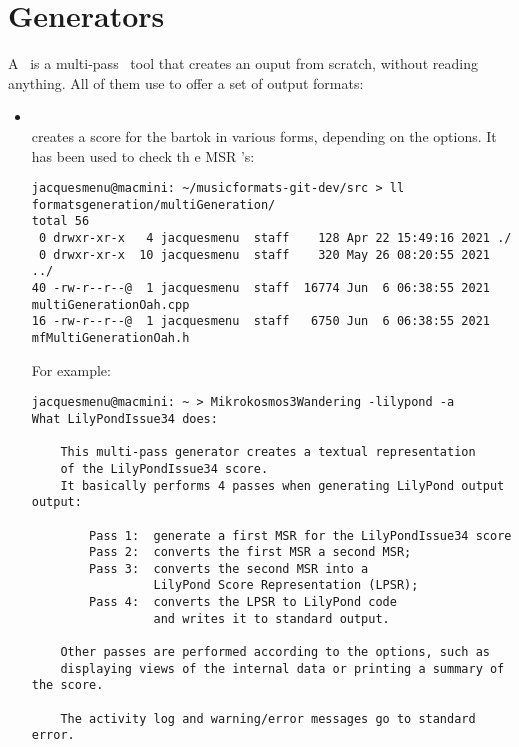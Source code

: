 \section{Generators}

A \generator\ is a multi-pass \CLI\ tool that creates an ouput from scratch, without reading anything. All of them use  to offer a set of output formats:
\begin{itemize}
\item {}\\
			creates a score for the bartok in various forms, depending on the options. It has been used to check th e MSR \API's:

\begin{lstlisting}[language=Terminal]
jacquesmenu@macmini: ~/musicformats-git-dev/src > ll formatsgeneration/multiGeneration/
total 56
 0 drwxr-xr-x   4 jacquesmenu  staff    128 Apr 22 15:49:16 2021 ./
 0 drwxr-xr-x  10 jacquesmenu  staff    320 May 26 08:20:55 2021 ../
40 -rw-r--r--@  1 jacquesmenu  staff  16774 Jun  6 06:38:55 2021 multiGenerationOah.cpp
16 -rw-r--r--@  1 jacquesmenu  staff   6750 Jun  6 06:38:55 2021 mfMultiGenerationOah.h
\end{lstlisting}

For example:
\begin{lstlisting}[language=Terminal]
jacquesmenu@macmini: ~ > Mikrokosmos3Wandering -lilypond -a
What LilyPondIssue34 does:

    This multi-pass generator creates a textual representation
    of the LilyPondIssue34 score.
    It basically performs 4 passes when generating LilyPond output output:

        Pass 1:  generate a first MSR for the LilyPondIssue34 score
        Pass 2:  converts the first MSR a second MSR;
        Pass 3:  converts the second MSR into a
                 LilyPond Score Representation (LPSR);
        Pass 4:  converts the LPSR to LilyPond code
                 and writes it to standard output.

    Other passes are performed according to the options, such as
    displaying views of the internal data or printing a summary of the score.

    The activity log and warning/error messages go to standard error.
\end{lstlisting}


\end{itemize}
